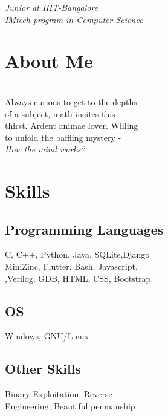 \documentclass[]{karthik_sama}
\begin{document}
%
%

\begin{minipage}[t]{0.33\textwidth} 
\begin{large}


\end{large}
\textit{\color{subs}Junior at IIIT-Bangalore\\}
\textit{IMtech program in Computer Science\\}

\section{About Me} 
\noindent{\color{hr}\rule{5cm}{0.4pt}}\\
Always curious to get to the depths\\
of a subject, math incites this \\
thirst. Ardent animae lover. Willing\\
to unfold the baffling mystery - \\
{\lat \emph{How the mind works?}}

\section{Skills}
\noindent{\color{hr}\rule{5cm}{0.4pt}}
\subsection{Programming Languages}
C, C++, Python, Java, SQLite,Django\\
MiniZinc, Flutter, Bash, Javascript,\\
,Verilog, GDB, HTML, CSS, Bootstrap.
\vspace{1pt}
\subsection{OS}
Windows, GNU/Linux
\vspace{1pt}
\subsection{Other Skills}
Binary Exploitation, Reverse\\
Engineering, Beautiful penmanship
\sectionsep

\end{minipage}
\end{document}
